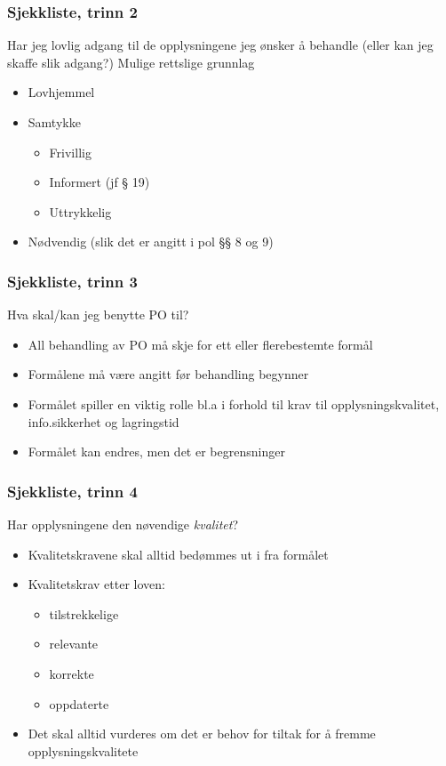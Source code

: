 \documentclass[11pt]{article}
\begin{document}
\subsubsection{Sjekkliste, trinn 2}
\label{sec-17.1.2}

    Har jeg lovlig adgang til de opplysningene jeg ønsker å behandle (eller kan jeg skaffe slik adgang?)
    Mulige rettslige grunnlag 
\begin{itemize}
\item Lovhjemmel
\item Samtykke

\begin{itemize}
\item Frivillig
\item Informert (jf § 19)
\item Uttrykkelig
\end{itemize}

\item Nødvendig (slik det er angitt i pol §§ 8 og 9)
\end{itemize}
\subsubsection{Sjekkliste, trinn 3}
\label{sec-17.1.3}

    Hva skal/kan jeg benytte PO til? 
\begin{itemize}
\item All behandling av PO må skje for ett eller flerebestemte formål
\item Formålene må være angitt før behandling begynner
\item Formålet spiller en viktig rolle bl.a i forhold til krav til opplysningskvalitet, 
      info.sikkerhet og lagringstid
\item Formålet kan endres, men det er begrensninger
\end{itemize}
\subsubsection{Sjekkliste, trinn 4}
\label{sec-17.1.4}

    Har opplysningene den nøvendige \emph{kvalitet}? 
\begin{itemize}
\item Kvalitetskravene skal alltid bedømmes ut i fra formålet
\item Kvalitetskrav etter loven:

\begin{itemize}
\item tilstrekkelige
\item relevante
\item korrekte
\item oppdaterte
\end{itemize}

\item Det skal alltid vurderes om det er behov for tiltak for å fremme opplysningskvalitete
\end{itemize}
\end{document}
